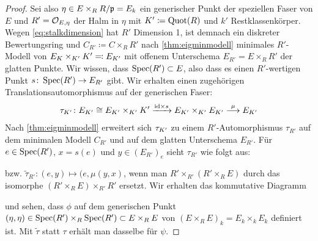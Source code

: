 \documentclass[german, bibliography=totoc]{scrreprt}
\begin{document}
\begin{Lemma}
\begin{proof}
    Sei also $\eta\in E\times_R R/\mathfrak{p}=E_k$ ein generischer Punkt der
    speziellen Faser von $E$ und $R'=\mathcal{O}_{E,\eta}$ der Halm in
    $\eta$ mit $K'\coloneqq\operatorname{Quot}(R)$ und $k'$
    Restklassenkörper. Wegen \ref{eq:stalkdimension} hat $R'$
    Dimension 1, ist demnach ein diskreter Bewertungsring und
    $C_{R'}\coloneqq C\times_R R'$ nach \ref{thm:eigminmodell}
    minimales $R'$-Modell von $E_{K}\times_{K'}K'\eqqcolon E_{K'}$
    mit offenem Unterschema $E_{R'}=E\times_R R'$ der glatten Punkte.
    Wir wissen, dass $\operatorname{Spec}(R')\subset E$, also dass es
    einen $R'$-wertigen Punkt $s\colon\operatorname{Spec}(R')\to E_{R'}$ gibt.
    Wir erhalten einen zugehörigen Translationsautomorphismus auf der
    generischen Faser:
    \begin{gather*}
      \tau_{K'}\colon
      E_{K'}\cong E_{K'}\times_{K'}K'
      \xrightarrow{\mathrm{id}\times s}
      E_{K'}\times_{K'}E_{K'}
      \overset{\mu}{\longrightarrow}
      E_{K'}
    \end{gather*}
    Nach \ref{thm:eigminmodell} erweitert sich $\tau_{K'}$ zu
    einem $R'$-Automorphismus $\tau_{R'}$ auf dem minimalen Modell
    $C_{R'}$ und auf dem glatten Unterschema $E_{R'}$.
    Für $e\in\operatorname{Spec}(R')$, $x=s(e)$ und $y\in(E_{R'})_e$ sieht $\tau_{R'}$
    wie folgt aus:
    \begin{center}
    \end{center}
    bzw. $\tilde\tau_{R'}\colon(e,y)\mapsto(e,\mu(y,x)$, wenn man
    $R'\times_{R'}(R'\times_R E)$ durch das isomorphe $(R'\times_R
    E)\times_{R'}R'$ ersetzt.
    Wir erhalten das kommutative Diagramm
    \begin{center}
    \end{center}
    und sehen, dass $\phi$ auf dem generischen Punkt
    $(\eta,\eta)\in\operatorname{Spec}(R')\times_R\operatorname{Spec}(R')\subset E\times_R E$
    von $(E\times_R E)_k=E_k\times_k E_k$ definiert ist.
    Mit $\tilde\tau$ statt $\tau$ erhält man dasselbe für $\psi$.

\end{proof}
\end{Lemma}
\end{document}
